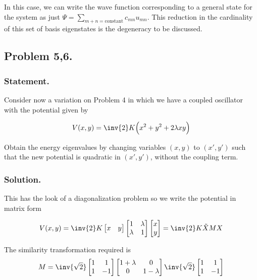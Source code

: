 In this case, we can write the wave function corresponding to a general state for the system as just $\Psi = \sum_{m+ n = \text{constant}} c_{mn} u_{mn}$.  This reduction in the cardinality of this set of basis eigenstates is the degeneracy to be discussed.

\subsection{Problem 5,6.}
\subsubsection{Statement.}

Consider now a variation on Problem 4 in which we have a coupled oscillator with the potential given by

\begin{align}\label{eqn:desaiCh9:500}
V(x,y) = \inv{2} K \Bigl( x^2 + y^2 + 2 \lambda x y \Bigr)
\end{align}

Obtain the energy eigenvalues by changing variables $(x,y)$ to $(x', y')$ such that the new potential is quadratic in $(x', y')$, without the coupling term.

\subsubsection{Solution.}

This has the look of a diagonalization problem so we write the potential in matrix form

\begin{align}\label{eqn:desaiCh9:501}
V(x,y)
= \inv{2} K
\begin{bmatrix}
x & y
\end{bmatrix}
\begin{bmatrix}
1 & \lambda \\
\lambda & 1
\end{bmatrix}
\begin{bmatrix}
x \\ y
\end{bmatrix} = \inv{2} K \tilde{X} M X
\end{align}

The similarity transformation required is
\begin{align}\label{eqn:desaiCh9:502}
M = \inv{\sqrt{2}}
\begin{bmatrix}
1 & 1 \\
1 & -1
\end{bmatrix}
\begin{bmatrix}
1+ \lambda & 0 \\
0 & 1 - \lambda
\end{bmatrix}
\inv{\sqrt{2}}
\begin{bmatrix}
1 & 1 \\
1 & -1
\end{bmatrix}
\end{align}

